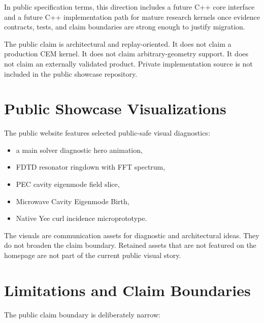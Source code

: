 \documentclass[11pt,a4paper]{article}
\begin{document}
In public specification terms, this direction includes a future C++ core interface and a future C++ implementation path for mature research kernels once evidence contracts, tests, and claim boundaries are strong enough to justify migration.

The public claim is architectural and replay-oriented. It does not claim a production CEM kernel. It does not claim arbitrary-geometry support. It does not claim an externally validated product. Private implementation source is not included in the public showcase repository.

\section{Public Showcase Visualizations}

The public website features selected public-safe visual diagnostics:

\begin{itemize}
  \item a main solver diagnostic hero animation,
  \item FDTD resonator ringdown with FFT spectrum,
  \item PEC cavity eigenmode field slice,
  \item Microwave Cavity Eigenmode Birth,
  \item Native Yee curl incidence microprototype.
\end{itemize}

The visuals are communication assets for diagnostic and architectural ideas. They do not broaden the claim boundary. Retained assets that are not featured on the homepage are not part of the current public visual story.

\section{Limitations and Claim Boundaries}

The public claim boundary is deliberately narrow:
\end{document}
